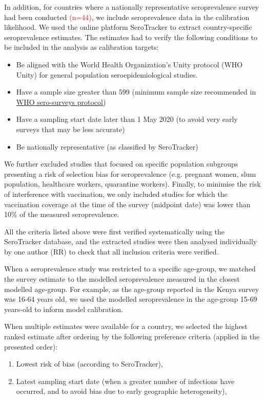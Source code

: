 
In addition, for countries where a nationally representative seroprevalence survey had been conducted \textcolor{red}{(n=44)}, we include
seroprevalence data in the calibration likelihood. We used the online platform SeroTracker to extract country-specific seroprevalence estimates. 
The estimates had to verify the following conditions to be included in the analysis as calibration targets:
\begin{itemize}
    \item Be aligned with the World Health Organization's Unity protocol (WHO Unity) for general population seroepidemiological studies.
    \item Have a sample size greater than 599 (minimum sample size recommended in \textcolor{blue}{\href{https://docs.google.com/document/d/1NYpszkr-u__aZspFDFa_fa4VBzjAAAAxNxM1rZ1txWU/edit}{WHO sero-surveys protocol}})
    \item Have a sampling start date later than 1 May 2020 (to avoid very early surveys that may be less accurate)
    \item Be nationally representative (as classified by SeroTracker)
\end{itemize}

We further excluded studies that focused on specific population subgroups presenting a risk of selection bias for seroprevalence (e.g. pregnant women, slum population, healthcare workers, quarantine workers). 
Finally, to minimise the risk of interference with vaccination, we only included studies for which the vaccination coverage at the time of the survey (midpoint date) 
was lower than 10\% of the measured seroprevalence.

All the criteria listed above were first verified systematically using the SeroTracker database, and the extracted studies were then analysed individually by one author (RR) to check 
that all inclusion criteria were verified.

When a seroprevalence study was restricted to a specific age-group, we matched the survey estimate to the modelled seroprevalence measured in the 
closest modelled age-group. For example, as the age-group reported in the Kenya survey was 16-64 years old, we used the modelled seroprevalence 
in the age-group 15-69 years-old to inform model calibration. 

When multiple estimates were available for a country, we selected the highest ranked estimate after ordering by the following preference criteria (applied in the presented order):
\begin{enumerate}
    \item Lowest risk of bias (according to SeroTracker),
    \item Latest sampling start date (when a greater number of infections have occurred, and to avoid bias due to early geographic heterogeneity),
\end{enumerate}

